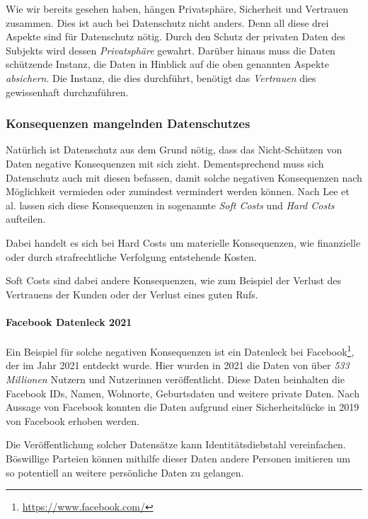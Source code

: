 Wie wir bereits gesehen haben, hängen Privatsphäre, Sicherheit und Vertrauen zusammen. 
Dies ist auch bei Datenschutz nicht anders. Denn all diese drei Aspekte sind für Datenschutz nötig.
Durch den Schutz der privaten Daten des Subjekts wird dessen \emph{Privatsphäre} gewahrt.
Darüber hinaus muss die Daten schützende Instanz, die Daten in Hinblick auf die oben genannten Aspekte \emph{absichern}.
Die Instanz, die dies durchführt, benötigt das \emph{Vertrauen} dies gewissenhaft durchzuführen.

\subsubsection{Konsequenzen mangelnden Datenschutzes}

Natürlich ist Datenschutz aus dem Grund nötig, dass das Nicht-Schützen von Daten negative Konsequenzen mit sich zieht.
Dementsprechend muss sich Datenschutz auch mit diesen befassen, damit solche negativen Konsequenzen nach Möglichkeit vermieden oder zumindest vermindert werden können.
Nach Lee et al. lassen sich diese Konsequenzen in sogenannte \emph{Soft Costs} und \emph{Hard Costs} aufteilen. \cite{lee_ethical_2016}

Dabei handelt es sich bei Hard Costs um materielle Konsequenzen, wie finanzielle oder durch strafrechtliche Verfolgung entstehende Kosten.

Soft Costs sind dabei andere Konsequenzen, wie zum Beispiel der Verlust des Vertrauens der Kunden oder der Verlust eines guten Rufs.

\paragraph*{Facebook Datenleck 2021}

Ein Beispiel für solche negativen Konsequenzen ist ein Datenleck bei Facebook\footnote{\url{https://www.facebook.com/}}, 
der im Jahr 2021 entdeckt wurde.\cite{holmes_533_2021}
Hier wurden in 2021 die Daten von über \emph{533 Millionen} Nutzern und Nutzerinnen veröffentlicht.
Diese Daten beinhalten die Facebook IDs, Namen, Wohnorte, Geburtsdaten und weitere private Daten.
Nach Aussage von Facebook konnten die Daten aufgrund einer Sicherheitslücke in 2019 von Facebook erhoben werden.\cite{clark_facts_2021}

Die Veröffentlichung solcher Datensätze kann Identitätsdiebstahl vereinfachen.
Böswillige Parteien können mithilfe dieser Daten andere Personen imitieren um so potentiell an weitere persönliche Daten zu gelangen.

